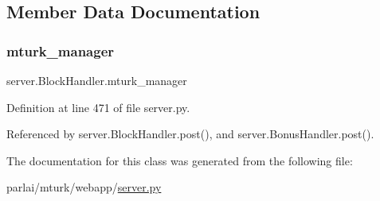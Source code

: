 \subsection{Member Data Documentation}
\mbox{\label{classserver_1_1BlockHandler_a2edbf1b3f694d2b64432c1c69815aa48}} 
\subsubsection{\texorpdfstring{mturk\+\_\+manager}{mturk\_manager}}
{\footnotesize\ttfamily server.\+Block\+Handler.\+mturk\+\_\+manager}



Definition at line 471 of file server.\+py.



Referenced by server.\+Block\+Handler.\+post(), and server.\+Bonus\+Handler.\+post().



The documentation for this class was generated from the following file\+:\begin{DoxyCompactItemize}
\item 
parlai/mturk/webapp/\hyperlink{server_8py}{server.\+py}\end{DoxyCompactItemize}
